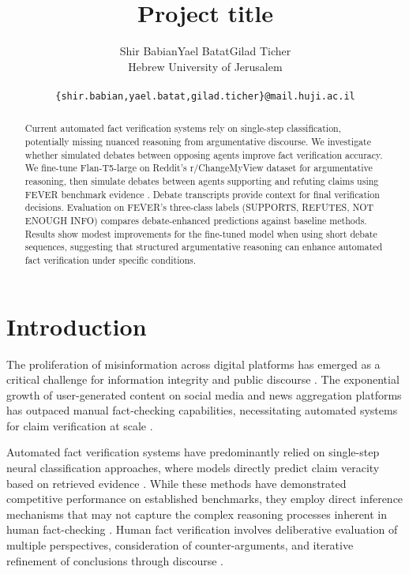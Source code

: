 \documentclass[11pt]{article}
\title{Project title}
\author{
    Shir Babian\qquad Yael Batat\qquad Gilad Ticher \\
    Hebrew University of Jerusalem \\\\
  \texttt{\{shir.babian,yael.batat,gilad.ticher\}@mail.huji.ac.il} \\}
\begin{document}
\maketitle
\begin{abstract}
Current automated fact verification systems rely on single-step classification, potentially missing nuanced reasoning from argumentative discourse. We investigate whether simulated debates between opposing agents improve fact verification accuracy. We fine-tune Flan-T5-large \cite{t5} on Reddit's r/ChangeMyView dataset \cite{winarg} for argumentative reasoning, then simulate debates between agents supporting and refuting claims using FEVER benchmark evidence \cite{FEVER}. Debate transcripts provide context for final verification decisions. Evaluation on FEVER's three-class labels (SUPPORTS, REFUTES, NOT ENOUGH INFO) compares debate-enhanced predictions against baseline methods. Results show modest improvements for the fine-tuned model when using short debate sequences, suggesting that structured argumentative reasoning can enhance automated fact verification under specific conditions.
\end{abstract}

\section{Introduction}

The proliferation of misinformation across digital platforms has emerged as a critical challenge for information integrity and public discourse \cite{vosoughi2018spread}. The exponential growth of user-generated content on social media and news aggregation platforms has outpaced manual fact-checking capabilities, necessitating automated systems for claim verification at scale \cite{kotonya2020explainable}.

Automated fact verification systems have predominantly relied on single-step neural classification approaches, where models directly predict claim veracity based on retrieved evidence \cite{thorne2018fever, augenstein2019multifc}. While these methods have demonstrated competitive performance on established benchmarks, they employ direct inference mechanisms that may not capture the complex reasoning processes inherent in human fact-checking \cite{popat2017truth}. Human fact verification involves deliberative evaluation of multiple perspectives, consideration of counter-arguments, and iterative refinement of conclusions through discourse \cite{toulmin2003uses}.
\end{document}
